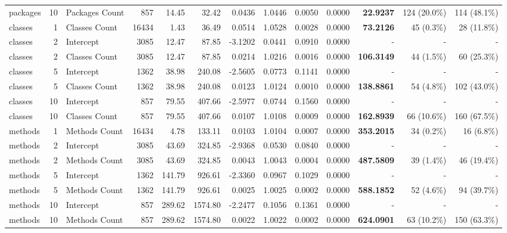 \begin{table}[H]
{\begin{tabular}{l r l r r r r r r r r r r}
packages & 10 & Packages Count & 857 & 14.45 & 32.42 & 0.0436 & 1.0446 & 0.0050 & 0.0000 & \textbf{22.9237} & 124 (20.0\%) & 114 (48.1\%) \\ 
classes & 1 & Classes Count & 16434 & 1.43 & 36.49 & 0.0514 & 1.0528 & 0.0028 & 0.0000 & \textbf{73.2126} & 45 (0.3\%) & 28 (11.8\%) \\ 
classes & 2 & Intercept & 3085 & 12.47 & 87.85 & -3.1202 & 0.0441 & 0.0910 & 0.0000 & - & - & - \\ 
classes & 2 & Classes Count & 3085 & 12.47 & 87.85 & 0.0214 & 1.0216 & 0.0016 & 0.0000 & \textbf{106.3149} & 44 (1.5\%) & 60 (25.3\%) \\ 
classes & 5 & Intercept & 1362 & 38.98 & 240.08 & -2.5605 & 0.0773 & 0.1141 & 0.0000 & - & - & - \\ 
classes & 5 & Classes Count & 1362 & 38.98 & 240.08 & 0.0123 & 1.0124 & 0.0010 & 0.0000 & \textbf{138.8861} & 54 (4.8\%) & 102 (43.0\%) \\ 
classes & 10 & Intercept & 857 & 79.55 & 407.66 & -2.5977 & 0.0744 & 0.1560 & 0.0000 & - & - & - \\ 
classes & 10 & Classes Count & 857 & 79.55 & 407.66 & 0.0107 & 1.0108 & 0.0009 & 0.0000 & \textbf{162.8939} & 66 (10.6\%) & 160 (67.5\%) \\ 
methods & 1 & Methods Count & 16434 & 4.78 & 133.11 & 0.0103 & 1.0104 & 0.0007 & 0.0000 & \textbf{353.2015} & 34 (0.2\%) & 16 (6.8\%) \\ 
methods & 2 & Intercept & 3085 & 43.69 & 324.85 & -2.9368 & 0.0530 & 0.0840 & 0.0000 & - & - & - \\ 
methods & 2 & Methods Count & 3085 & 43.69 & 324.85 & 0.0043 & 1.0043 & 0.0004 & 0.0000 & \textbf{487.5809} & 39 (1.4\%) & 46 (19.4\%) \\ 
methods & 5 & Intercept & 1362 & 141.79 & 926.61 & -2.3360 & 0.0967 & 0.1029 & 0.0000 & - & - & - \\ 
methods & 5 & Methods Count & 1362 & 141.79 & 926.61 & 0.0025 & 1.0025 & 0.0002 & 0.0000 & \textbf{588.1852} & 52 (4.6\%) & 94 (39.7\%) \\ 
methods & 10 & Intercept & 857 & 289.62 & 1574.80 & -2.2477 & 0.1056 & 0.1361 & 0.0000 & - & - & - \\ 
methods & 10 & Methods Count & 857 & 289.62 & 1574.80 & 0.0022 & 1.0022 & 0.0002 & 0.0000 & \textbf{624.0901} & 63 (10.2\%) & 150 (63.3\%) \\ 
\end{tabular}%
} 
\end{table}
\newpage 

